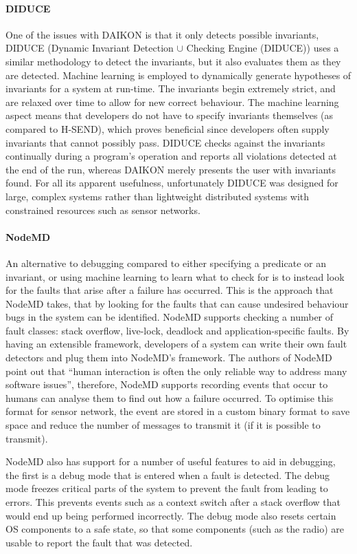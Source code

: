 \paragraph{DIDUCE} One of the issues with DAIKON is that it only detects possible invariants, DIDUCE \cite{diduce} (Dynamic Invariant Detection $\cup$ Checking Engine (DIDUCE)) uses a similar methodology to detect the invariants, but it also evaluates them as they are detected. Machine learning is employed to dynamically generate hypotheses of invariants for a system at run-time. The invariants begin extremely strict, and are relaxed over time to allow for new correct behaviour. The machine learning aspect means that developers do not have to specify invariants themselves (as compared to H-SEND), which proves beneficial since developers often supply invariants that cannot possibly pass\cite{diduce}. DIDUCE checks against the invariants continually during a program's operation and reports all violations detected at the end of the run, whereas DAIKON merely presents the user with invariants found. For all its apparent usefulness, unfortunately DIDUCE was designed for large, complex systems rather than lightweight distributed systems with constrained resources such as sensor networks.

\paragraph{NodeMD} An alternative to debugging compared to either specifying a predicate or an invariant, or using machine learning to learn what to check for is to instead look for the faults that arise after a failure has occurred. This is the approach that NodeMD \cite{NodeMD} takes, that by looking for the faults that can cause undesired behaviour bugs in the system can be identified. NodeMD supports checking a number of fault classes: stack overflow, live-lock, deadlock and application-specific faults. By having an extensible framework, developers of a system can write their own fault detectors and plug them into NodeMD's framework. The authors of NodeMD point out that ``human interaction is often the only reliable way to address many software issues'', therefore, NodeMD supports recording events that occur to humans can analyse them to find out how a failure occurred. To optimise this format for sensor network, the event are stored in a custom binary format to save space and reduce the number of messages to transmit it (if it is possible to transmit).

NodeMD also has support for a number of useful features to aid in debugging, the first is a debug mode that is entered when a fault is detected. The debug mode freezes critical parts of the system to prevent the fault from leading to errors. This prevents events such as a context switch after a stack overflow that would end up being performed incorrectly. The debug mode also resets certain OS components to a safe state, so that some components (such as the radio) are usable to report the fault that was detected.

